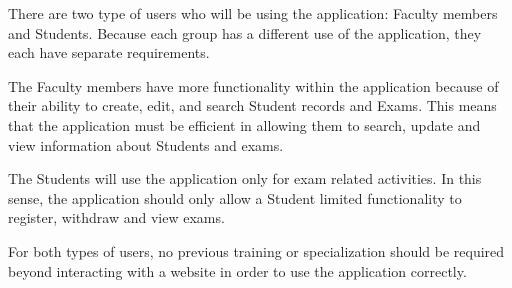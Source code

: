 
There are two type of users  who will be using the application:
Faculty members and Students. Because each group has a different use of the
application, they each have separate requirements. 

The Faculty members have more functionality within the application because of
their ability to create, edit, and search Student records and Exams. This means
that the application must be efficient in allowing them to search, update and
view information about Students and exams.

The Students will use the application only for exam related activities. In this
sense, the application should only allow a Student limited functionality to
register, withdraw and view exams.

For both types of users, no previous training  or specialization should be
required beyond interacting with a website in order to use the application
correctly.
